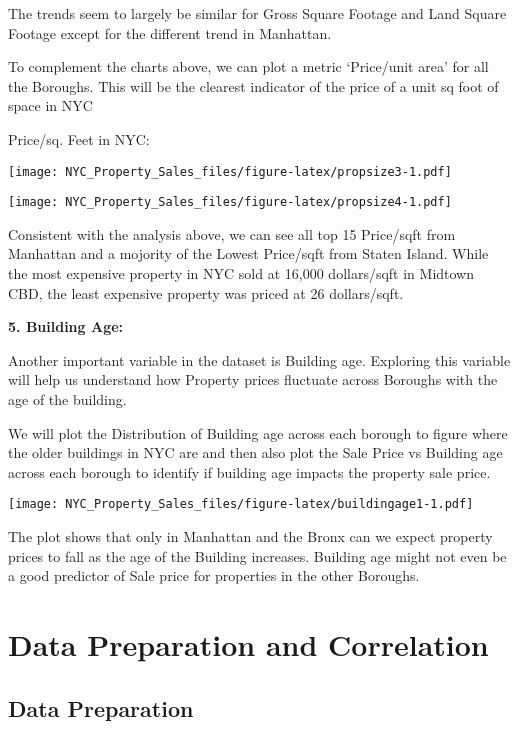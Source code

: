 \documentclass[
  a3paper,
]{article}
\begin{document}
The trends seem to largely be similar for Gross Square Footage and Land
Square Footage except for the different trend in Manhattan.

To complement the charts above, we can plot a metric `Price/unit area'
for all the Boroughs. This will be the clearest indicator of the price
of a unit sq foot of space in NYC \newpage

Price/sq. Feet in NYC:

\texttt{[image: NYC\_Property\_Sales\_files/figure-latex/propsize3-1.pdf]}

\texttt{[image: NYC\_Property\_Sales\_files/figure-latex/propsize4-1.pdf]}

Consistent with the analysis above, we can see all top 15 Price/sqft
from Manhattan and a mojority of the Lowest Price/sqft from Staten
Island. While the most expensive property in NYC sold at 16,000
dollars/sqft in Midtown CBD, the least expensive property was priced at
26 dollars/sqft.\\
\newpage

\textbf{5. Building Age:}

Another important variable in the dataset is Building age. Exploring
this variable will help us understand how Property prices fluctuate
across Boroughs with the age of the building.

We will plot the Distribution of Building age across each borough to
figure where the older buildings in NYC are and then also plot the Sale
Price vs Building age across each borough to identify if building age
impacts the property sale price.

\texttt{[image: NYC\_Property\_Sales\_files/figure-latex/buildingage1-1.pdf]}

The plot shows that only in Manhattan and the Bronx can we expect
property prices to fall as the age of the Building increases. Building
age might not even be a good predictor of Sale price for properties in
the other Boroughs.

\newpage

\hypertarget{data-preparation-and-correlation}{%
\section{\texorpdfstring{\textbf{Data Preparation and
Correlation}}{Data Preparation and Correlation}}\label{data-preparation-and-correlation}}

\hypertarget{data-preparation-1}{%
\subsection{\texorpdfstring{\textbf{Data
Preparation}}{Data Preparation}}\label{data-preparation-1}}
\end{document}
